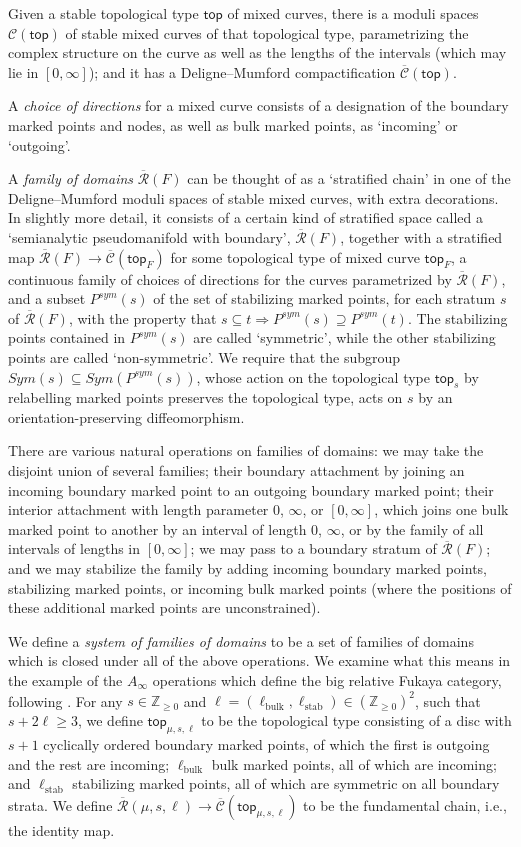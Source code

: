 \documentclass{article}
\def\cC{\mathcal{C}}
\def\Z{\mathbb{Z}}
\def\Rbar{\overline{\mathcal{R}}}
\def\Cbar{\overline{\mathcal{C}}}
\def\Cbar{\overline{\cC}}
\def\stab{\mathrm{stab}}
\def\top{{\mathsf{top}}}
\def\bulk{{\operatorname{bulk}}}
\begin{document}
Given a stable topological type $\top$ of mixed curves, there is a moduli spaces $\cC(\top)$ of stable mixed curves of that topological type, parametrizing the complex structure on the curve as well as the lengths of the intervals (which may lie in $[0,\infty]$); and it has a Deligne--Mumford compactification $\Cbar(\top)$.

A \emph{choice of directions} for a mixed curve consists of a designation of the boundary marked points and nodes, as well as bulk marked points, as `incoming' or `outgoing'. 

A \emph{family of domains} $\Rbar(F)$ can be thought of as a `stratified chain' in one of the Deligne--Mumford moduli spaces of stable mixed curves, with extra decorations. 
In slightly more detail, it consists of a certain kind of stratified space called a `semianalytic pseudomanifold with boundary', $\Rbar(F)$, together with a stratified map $\Rbar(F) \to \Cbar(\top_F)$ for some topological type of mixed curve $\top_F$, a continuous family of choices of directions for the curves parametrized by $\Rbar(F)$, and a subset $P^{sym}(s)$ of the set of stabilizing marked points, for each stratum $s$ of $\Rbar(F)$, with the property that $s \subseteq t \Rightarrow P^{sym}(s) \supseteq P^{sym}(t)$. 
The stabilizing points contained in $P^{sym}(s)$ are called `symmetric', while the other stabilizing points are called `non-symmetric'. 
We require that the subgroup $Sym(s) \subseteq Sym(P^{sym}(s))$, whose action on the topological type $\top_s$ by relabelling marked points preserves the topological type, acts on $s$ by an orientation-preserving diffeomorphism.

There are various natural operations on families of domains: we may take the disjoint union of several families; their boundary attachment by joining an incoming boundary marked point to an outgoing boundary marked point; their interior attachment with length parameter $0$, $\infty$, or $[0,\infty]$, which joins one bulk marked point to another by an interval of length $0$, $\infty$, or by the family of all intervals of lengths in $[0,\infty]$; we may pass to a boundary stratum of $\Rbar(F)$; and we may stabilize the family by adding incoming boundary marked points, stabilizing marked points, or incoming bulk marked points (where the positions of these additional marked points are unconstrained). 

We define a \emph{system of families of domains} to be a set of families of domains which is closed under all of the above operations. We examine what this means in the example of the $A_\infty$ operations which define the big relative Fukaya category, following \cite[Section 5.2]{relfukii}. 
For any $s \in \Z_{\ge 0}$ and $\ell = (\ell_\bulk,\ell_\stab) \in (\Z_{\ge 0})^2$, such that $s+2\ell \ge 3$, we define $\top_{\mu,s,\ell}$ to be the topological type consisting of a disc with $s+1$ cyclically ordered boundary marked points, of which the first is outgoing and the rest are incoming; $\ell_\bulk$ bulk marked points, all of which are incoming; and $\ell_\stab$ stabilizing marked points, all of which are symmetric on all boundary strata. 
We define $\Rbar(\mu,s,\ell) \to \Cbar(\top_{\mu,s,\ell})$ to be the fundamental chain, i.e., the identity map. 
\end{document}
